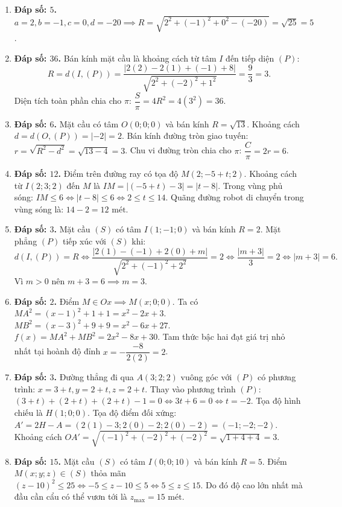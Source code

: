 \documentclass[12pt,a4paper]{article}
\begin{document}
\begin{enumerate}
\item \textbf{Đáp số: $5$.}  
$a = 2, b = -1, c = 0, d = -20 \implies R = \sqrt{2^2 + (-1)^2 + 0^2 - (-20)} = \sqrt{25} = 5$.

\item \textbf{Đáp số: $36$.}  
Bán kính mặt cầu là khoảng cách từ tâm $I$ đến tiếp diện $(P)$:
\[
R = d(I, (P)) = \dfrac{|2(2) - 2(1) + (-1) + 8|}{\sqrt{2^2 + (-2)^2 + 1^2}} = \dfrac{9}{3} = 3.
\]
Diện tích toàn phần chia cho $\pi$: $\dfrac{S}{\pi} = 4R^2 = 4(3^2) = 36$.

\item \textbf{Đáp số: $6$.}  
Mặt cầu có tâm $O(0; 0; 0)$ và bán kính $R = \sqrt{13}$.  
Khoảng cách $d = d(O, (P)) = |-2| = 2$.  
Bán kính đường tròn giao tuyến: $r = \sqrt{R^2 - d^2} = \sqrt{13 - 4} = 3$.  
Chu vi đường tròn chia cho $\pi$: $\dfrac{C}{\pi} = 2r = 6$.

\item \textbf{Đáp số: $12$.}  
Điểm trên đường ray có tọa độ $M(2; -5 + t; 2)$.  
Khoảng cách từ $I(2; 3; 2)$ đến $M$ là $IM = |(-5 + t) - 3| = |t - 8|$.  
Trong vùng phủ sóng: $IM \le 6 \iff |t - 8| \le 6 \iff 2 \le t \le 14$.  
Quãng đường robot di chuyển trong vùng sóng là: $14 - 2 = 12\text{ mét}$.

\item \textbf{Đáp số: $3$.}  
Mặt cầu $(S)$ có tâm $I(1; -1; 0)$ và bán kính $R = 2$.  
Mặt phẳng $(P)$ tiếp xúc với $(S)$ khi:
\[
d(I, (P)) = R \iff \dfrac{|2(1) - (-1) + 2(0) + m|}{\sqrt{2^2 + (-1)^2 + 2^2}} = 2 \iff \dfrac{|m + 3|}{3} = 2 \iff |m + 3| = 6.
\]
Vì $m > 0$ nên $m + 3 = 6 \implies m = 3$.

\item \textbf{Đáp số: $2$.}  
Điểm $M \in Ox \implies M(x; 0; 0)$.  
Ta có $MA^2 = (x - 1)^2 + 1 + 1 = x^2 - 2x + 3$.  
$MB^2 = (x - 3)^2 + 9 + 9 = x^2 - 6x + 27$.  
$f(x) = MA^2 + MB^2 = 2x^2 - 8x + 30$.  
Tam thức bậc hai đạt giá trị nhỏ nhất tại hoành độ đỉnh $x = -\dfrac{-8}{2(2)} = 2$.

\item \textbf{Đáp số: $3$.}  
Đường thẳng đi qua $A(3; 2; 2)$ vuông góc với $(P)$ có phương trình: $x = 3 + t, y = 2 + t, z = 2 + t$.  
Thay vào phương trình $(P)$: $(3 + t) + (2 + t) + (2 + t) - 1 = 0 \iff 3t + 6 = 0 \iff t = -2$.  
Tọa độ hình chiếu là $H(1; 0; 0)$.  
Tọa độ điểm đối xứng: $A' = 2H - A = (2(1) - 3; 2(0) - 2; 2(0) - 2) = (-1; -2; -2)$.  
Khoảng cách $OA' = \sqrt{(-1)^2 + (-2)^2 + (-2)^2} = \sqrt{1 + 4 + 4} = 3$.

\item \textbf{Đáp số: $15$.}  
Mặt cầu $(S)$ có tâm $I(0; 0; 10)$ và bán kính $R = 5$.  
Điểm $M(x; y; z) \in (S)$ thỏa mãn $(z - 10)^2 \le 25 \iff -5 \le z - 10 \le 5 \iff 5 \le z \le 15$.  
Do đó độ cao lớn nhất mà đầu cần cẩu có thể vươn tới là $z_{\max} = 15\text{ mét}$.
\end{enumerate}
\end{document}
